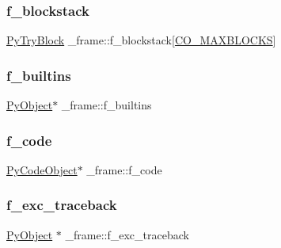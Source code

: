 \mbox{\label{struct__frame_a7bb5b52ff4d50835f67738158d7d9a02}} 
\subsubsection{\texorpdfstring{f\_blockstack}{f\_blockstack}}
{\footnotesize\ttfamily \mbox{\hyperlink{struct_py_try_block}{Py\+Try\+Block}} \+\_\+frame\+::f\+\_\+blockstack\mbox{[}\mbox{\hyperlink{code_8h_a3667103ec7f96a81ef3d4529d3cd0f88}{C\+O\+\_\+\+M\+A\+X\+B\+L\+O\+C\+KS}}\mbox{]}}

\mbox{\label{struct__frame_aef7749f09670f4ef49043aa80261a96f}} 
\subsubsection{\texorpdfstring{f\_builtins}{f\_builtins}}
{\footnotesize\ttfamily \mbox{\hyperlink{_python27_2object_8h_aadc84ac7aed2cfa6f20c25f62bf3dac7}{Py\+Object}}$\ast$ \+\_\+frame\+::f\+\_\+builtins}

\mbox{\label{struct__frame_a6c43e49e9a1dda4b0da3b584e94213f0}} 
\subsubsection{\texorpdfstring{f\_code}{f\_code}}
{\footnotesize\ttfamily \mbox{\hyperlink{struct_py_code_object}{Py\+Code\+Object}}$\ast$ \+\_\+frame\+::f\+\_\+code}

\mbox{\label{struct__frame_ac1ad471552c27336a9c6f35a43a738bb}} 
\subsubsection{\texorpdfstring{f\_exc\_traceback}{f\_exc\_traceback}}
{\footnotesize\ttfamily \mbox{\hyperlink{_python27_2object_8h_aadc84ac7aed2cfa6f20c25f62bf3dac7}{Py\+Object}} $\ast$ \+\_\+frame\+::f\+\_\+exc\+\_\+traceback}

